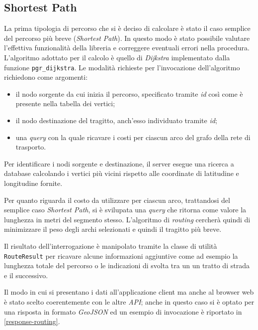 \subsection{Shortest Path}
La prima tipologia di percorso che si è deciso di calcolare è stato il caso semplice del percorso più breve (\emph{Shortest Path}). In questo modo è stato possibile valutare l'effettiva funzionalità della libreria e correggere eventuali errori nella procedura.
L'algoritmo adottato per il calcolo è quello di \emph{Dijkstra} implementato dalla funzione \texttt{pgr\_dijkstra}. Le modalità richieste per l'invocazione dell'algoritmo richiedono come argomenti:
\begin{itemize}
\item il nodo sorgente da cui inizia il percorso, specificato tramite \emph{id} così come è presente nella tabella dei vertici;
\item il nodo destinazione del tragitto, anch'esso individuato tramite \emph{id};
\item una \emph{query} con la quale ricavare i costi per ciascun arco del grafo della rete di trasporto.
\end{itemize}
Per identificare i nodi sorgente e destinazione, il server esegue una ricerca a database calcolando i vertici più vicini rispetto alle coordinate di latitudine e longitudine fornite. 

Per quanto riguarda il costo da utilizzare per ciascun arco, trattandosi del semplice caso \emph{Shortest Path}, si è svilupata una \emph{query} che ritorna come valore la lunghezza in metri del segmento stesso. L'algoritmo di \emph{routing} cercherà quindi di minimizzare il peso degli archi selezionati e quindi il tragitto più breve.

Il risultato dell'interrogazione è manipolato tramite la classe di utilità \texttt{RouteResult} per ricavare alcune informazioni aggiuntive come ad esempio la lunghezza totale del percorso o le indicazioni di svolta tra un un tratto di strada e il successivo. 

Il modo in cui si presentano i dati all'applicazione client ma anche al browser web è stato scelto coerentemente con le altre \emph{API}; anche in questo caso si è optato per una risposta in formato \emph{GeoJSON} ed un esempio di invocazione è riportato in \ref{response-routing}.


